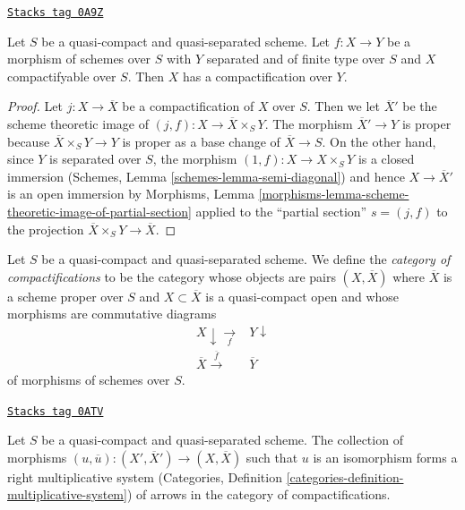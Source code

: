 \begin{lemma}[Compactifyable]
\label{flat-lemma-compactifyable}
\href{https://stacks.math.columbia.edu/tag/0A9Z}{\texttt{Stacks tag 0A9Z}}

Let $S$ be a quasi-compact and quasi-separated scheme. Let $f : X \to Y$
be a morphism of schemes over $S$ with $Y$ separated and of finite type
over $S$ and $X$ compactifyable over $S$. Then $X$ has a compactification
over $Y$.
\end{lemma}

\begin{proof}
Let $j : X \to \overline{X}$ be a compactification of $X$ over $S$.
Then we let $\overline{X}'$ be
the scheme theoretic image of $(j, f) : X \to \overline{X} \times_S Y$.
The morphism $\overline{X}' \to Y$ is proper because
$\overline{X} \times_S Y \to Y$ is proper as a base change of
$\overline{X} \to S$. On the other hand, since $Y$ is separated
over $S$, the morphism $(1, f) : X \to X \times_S Y$ is a closed
immersion (Schemes, Lemma \ref{schemes-lemma-semi-diagonal})
and hence $X \to \overline{X}'$ is an open immersion by Morphisms, Lemma
\ref{morphisms-lemma-scheme-theoretic-image-of-partial-section} applied
to the ``partial section'' $s = (j, f)$ to the projection
$\overline{X} \times_S Y \to \overline{X}$.
\end{proof}

Let $S$ be a quasi-compact and quasi-separated scheme.
We define the {\it category of compactifications} to be the category
whose objects are pairs $(X, \overline{X})$ where $\overline{X}$
is a scheme proper over $S$ and $X \subset \overline{X}$ is a
quasi-compact open and whose morphisms
are commutative diagrams
$$
\begin{array}{cc}X \downarrow\underset{f}{\longrightarrow} & Y \downarrow \\ \overline{X} \overset{\overline{f}}{\longrightarrow} & \overline{Y}\end{array}
$$
of morphisms of schemes over $S$.

\begin{lemma}
\label{flat-lemma-right-multiplicative-system}
\href{https://stacks.math.columbia.edu/tag/0ATV}{\texttt{Stacks tag 0ATV}}

Let $S$ be a quasi-compact and quasi-separated scheme.
The collection of morphisms
$(u, \overline{u}) : (X', \overline{X}') \to (X, \overline{X})$
such that $u$ is an isomorphism forms a right multiplicative system
(Categories, Definition \ref{categories-definition-multiplicative-system})
of arrows in the category of compactifications.
\end{lemma}

